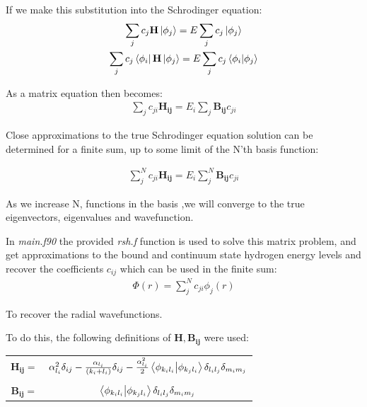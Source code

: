 \documentclass{article}
\renewcommand{\vec}[1]{\mathbf{#1}}
\begin{document}
    If we make this substitution into the Schrodinger equation:
    \large
    \begin{gather}
    	\sum_{j}c_j\vec{H}\ket{\phi_j} = E\sum_{j}c_j\ket{\phi_j}\\
    	\sum_{j}c_j\bra{\phi_i}\vec{H}\ket{\phi_j} = E\sum_{j}c_j\bra{\phi_i}\ket{\phi_j}
    \end{gather}
    \normalsize
    
    As a matrix equation then becomes:
    \large
    \begin{gather}
    	\sum_{j}c_{ji}\vec{H_{ij}} = E_i\sum_{j}\vec{B_{ij}}c_{ji}
    \end{gather}
    \normalsize


    Close approximations to the true Schrodinger equation solution can be determined for a finite sum, up to some limit of the N'th basis function:
    
	\large
	\begin{gather}
		\sum_{j}^{N}c_{ji}\vec{H_{ij}} = E_i\sum_{j}^{N}\vec{B_{ij}}c_{ji}
	\end{gather}
	\normalsize
	
	As we increase N, functions in the basis ,we will converge to the true eigenvectors, eigenvalues and wavefunction. 
	
	In \textit{main.f90} the provided \textit{rsh.f} function is used to solve this matrix problem, and get approximations to the bound and continuum state hydrogen energy levels and recover the coefficients $c_{ij}$ which can be used in the finite sum:
	\large
	\begin{gather}
		\Phi(r) = \sum_{j}^{N} c_{ji} \phi_j(r)
	\end{gather}
 	\normalsize
 	
 	To recover the radial wavefunctions.
 	
 	To do this, the following definitions of $\vec{H}, \vec{B_{ij}}$ were used:
 	
	\large
	\begin{center}
		\begin{tabular}{cc}
		$\vec{H_{ij}} =$ 	& $ \alpha_{l_i}^2\delta_{ij}    - \frac{\alpha_{l_i}}{(k_i + l_i)}\delta_{ij} -  \frac{\alpha_{l_i}^2}{2}\braket{\phi_{k_il_i}}{\phi_{k_jl_i}} \delta_{l_il_j} \delta_{m_im_j}$ \\
		& \\
		$\vec{B_{ij}} =$	& $\braket{\phi_{k_il_i}}{\phi_{k_jl_i}} \delta_{l_il_j} \delta_{m_im_j}$\\
		\end{tabular}
	\end{center}
	\normalsize
	
\end{document}
